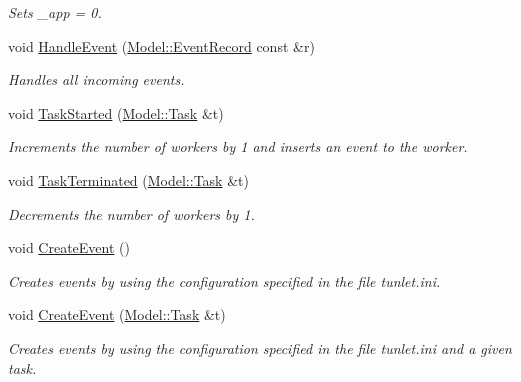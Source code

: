 \begin{DoxyCompactItemize}
\begin{DoxyCompactList}\small\item\em Sets \-\_\-app = 0. \end{DoxyCompactList}\item 
void \hyperlink{class_factoring_tunlet_aeb954297fd00f2801c807ef3ae2384f1}{Handle\-Event} (\hyperlink{class_model_1_1_event_record}{Model\-::\-Event\-Record} const \&r)
\begin{DoxyCompactList}\small\item\em Handles all incoming events. \end{DoxyCompactList}\item 
void \hyperlink{class_factoring_tunlet_ae99ec15c1e80a9fbfaf5f6e23bf8e7ef}{Task\-Started} (\hyperlink{class_model_1_1_task}{Model\-::\-Task} \&t)
\begin{DoxyCompactList}\small\item\em Increments the number of workers by 1 and inserts an event to the worker. \end{DoxyCompactList}\item 
void \hyperlink{class_factoring_tunlet_a08e03f7b58081ee5477af2fd47a5844a}{Task\-Terminated} (\hyperlink{class_model_1_1_task}{Model\-::\-Task} \&t)
\begin{DoxyCompactList}\small\item\em Decrements the number of workers by 1. \end{DoxyCompactList}\item 
\hypertarget{class_factoring_tunlet_a03bee1e1e468cb8cd2a4aacd7d5fd7de}{void \hyperlink{class_factoring_tunlet_a03bee1e1e468cb8cd2a4aacd7d5fd7de}{Create\-Event} ()}\label{class_factoring_tunlet_a03bee1e1e468cb8cd2a4aacd7d5fd7de}

\begin{DoxyCompactList}\small\item\em Creates events by using the configuration specified in the file tunlet.\-ini. \end{DoxyCompactList}\item 
void \hyperlink{class_factoring_tunlet_ad91b45da36e3a108d74bb43fd98c7683}{Create\-Event} (\hyperlink{class_model_1_1_task}{Model\-::\-Task} \&t)
\begin{DoxyCompactList}\small\item\em Creates events by using the configuration specified in the file tunlet.\-ini and a given task. \end{DoxyCompactList}\end{DoxyCompactItemize}


